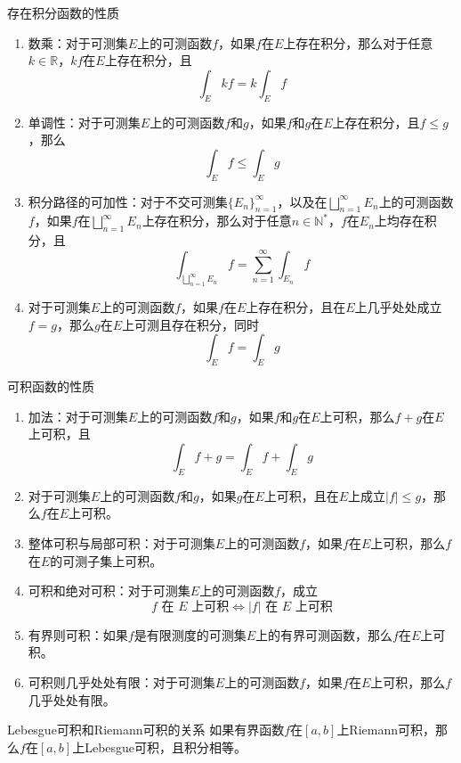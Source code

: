 \documentclass[lang = cn, scheme = chinese, thmcnt = section]{elegantbook}
\newcommand{\N}{\mathbb{N}}            %
\newcommand{\R}{\mathbb{R}}            %
\begin{document}
\begin{proposition}{存在积分函数的性质}
	\begin{enumerate}
		\item 数乘：对于可测集$E$上的可测函数$f$，如果$f$在$E$上存在积分，那么对于任意$k\in\R$，$kf$在$E$上存在积分，且
		$$
		\int_E kf=k\int_E f
		$$
		\item 单调性：对于可测集$E$上的可测函数$f$和$g$，如果$f$和$g$在$E$上存在积分，且$f\le g$​，那么
		$$
		\int_Ef\le \int_Eg
		$$
		\item 积分路径的可加性：对于不交可测集$\{ E_n \}_{n=1}^{\infty}$，以及在$\bigsqcup\limits_{n=1}^{\infty}E_n$上的可测函数$f$，如果$f$在$\bigsqcup\limits_{n=1}^{\infty}E_n$上存在积分，那么对于任意$n\in\N^*$，$f$在$E_n$上均存在积分，且
		$$
		\int_{\bigsqcup\limits_{n=1}^{\infty}E_n}f=\sum_{n=1}^{\infty}\int_{E_n}f
		$$
		\item 对于可测集$E$上的可测函数$f$，如果$f$在$E$上存在积分，且在$E$上几乎处处成立$f=g$，那么$g$在$E$上可测且存在积分，同时
		$$
		\int_Ef=\int_Eg
		$$
	\end{enumerate}
\end{proposition}

\begin{proposition}{可积函数的性质}
	\begin{enumerate}
		\item 加法：对于可测集$E$上的可测函数$f$和$g$，如果$f$和$g$在$E$上可积，那么$f+g$在$E$上可积，且
		$$
		\int_E f+g=\int_Ef+\int_Eg
		$$
		\item 对于可测集$E$上的可测函数$f$和$g$，如果$g$在$E$上可积，且在$E$上成立$|f|\le g$，那么$f$在$E$上可积。
		\item 整体可积与局部可积：对于可测集$E$上的可测函数$f$，如果$f$在$E$上可积，那么$f$在$E$的可测子集上可积。
		\item 可积和绝对可积：对于可测集$E$上的可测函数$f$，成立%
		$$
		f\text{ 在 }E\text{ 上可积}
		\iff
		|f|\text{ 在 }E\text{ 上可积}
		$$
		\item 有界则可积：如果$f$是有限测度的可测集$E$上的有界可测函数，那么$f$在$E$上可积。
		\item 可积则几乎处处有限：对于可测集$E$上的可测函数$f$，如果$f$在$E$上可积，那么$f$几乎处处有限。
	\end{enumerate}
\end{proposition}

\begin{theorem}{Lebesgue可积和Riemann可积的关系}
	如果有界函数$f$在$[a,b]$上Riemann可积，那么$f$在$[a,b]$上Lebesgue可积，且积分相等。
\end{theorem}
\end{document}

